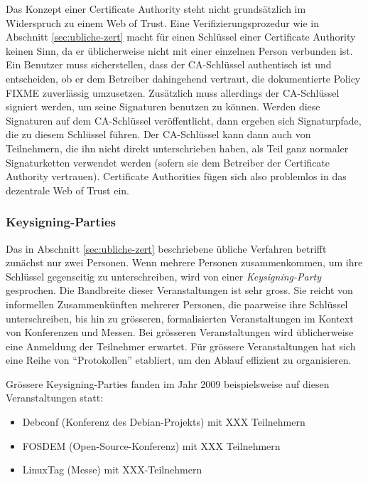 Das Konzept einer Certificate Authority steht nicht grunds\"atzlich im
Widerspruch zu einem Web of Trust. Eine Verifizierungsprozedur wie in
Abschnitt \ref{sec:ubliche-zert} macht f\"ur einen Schl\"ussel einer
Certificate Authority keinen Sinn, da er \"ublicherweise nicht mit
einer einzelnen Person verbunden ist. Ein Benutzer muss sicherstellen,
dass der CA-Schl\"ussel authentisch ist und entscheiden, ob er dem
Betreiber dahingehend vertraut, die dokumentierte Policy FIXME
zuverl\"assig umzusetzen. Zus\"atzlich muss allerdings der
CA-Schl\"ussel signiert werden, um seine Signaturen benutzen zu
k\"onnen. Werden diese Signaturen auf dem CA-Schl\"ussel
ver\"offentlicht, dann ergeben sich Signaturpfade, die zu diesem
Schl\"ussel f\"uhren. Der CA-Schl\"ussel kann dann auch von
Teilnehmern, die ihn nicht direkt unterschrieben haben, als Teil ganz
normaler Signaturketten verwendet werden (sofern sie dem Betreiber der
Certificate Authority vertrauen). Certificate Authorities f\"ugen sich
also problemlos in das dezentrale Web of Trust ein.

\subsubsection{Keysigning-Parties}
\label{sec:keysigning-parties}

Das in Abschnitt \ref{sec:ubliche-zert} beschriebene \"ubliche
Verfahren betrifft zun\"achst nur zwei Personen. Wenn mehrere Personen
zusammenkommen, um ihre Schl\"ussel gegenseitig zu unterschreiben,
wird von einer \emph{Keysigning-Party} gesprochen. Die Bandbreite
dieser Veranstaltungen ist sehr gross. Sie reicht von informellen
Zusammenk\"unften mehrerer Personen, die paarweise ihre Schl\"ussel
unterschreiben, bis hin zu gr\"osseren, formalisierten Veranstaltungen
im Kontext von Konferenzen und Messen. Bei gr\"osseren Veranstaltungen
wird \"ublicherweise eine Anmeldung der Teilnehmer erwartet. F\"ur
gr\"ossere Veranstaltungen hat sich eine Reihe von ``Protokollen''
etabliert, um den Ablauf effizient zu organisieren\cite{Brennen2008}.

Gr\"ossere Keysigning-Parties fanden im Jahr 2009 beispielsweise auf
diesen Veranstaltungen statt:
\begin{itemize}
\item Debconf (Konferenz des Debian-Projekts) mit XXX Teilnehmern
\item FOSDEM (Open-Source-Konferenz) mit XXX Teilnehmern
\item LinuxTag (Messe) mit XXX-Teilnehmern
\end{itemize}


